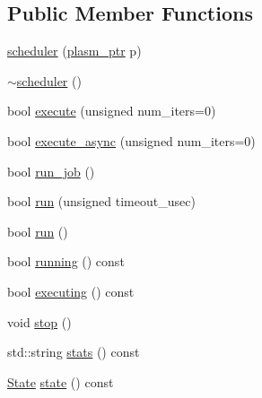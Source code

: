 \subsection*{\-Public \-Member \-Functions}
\begin{DoxyCompactItemize}
\item 
\hyperlink{classecto_1_1scheduler_a3a2999bde52bfacfc194243ef2ae4f89}{scheduler} (\hyperlink{namespaceecto_a6b83be6cd685db71f03b14871653475f}{plasm\-\_\-ptr} p)
\item 
\hyperlink{classecto_1_1scheduler_aac758e34705ebab32cf66bdf42f0d89d}{$\sim$scheduler} ()
\item 
bool \hyperlink{classecto_1_1scheduler_ad917e3fa322f0a065e306afec7284d4e}{execute} (unsigned num\-\_\-iters=0)
\item 
bool \hyperlink{classecto_1_1scheduler_a2e9982c19e57c9e578d2f8f54c24dc1a}{execute\-\_\-async} (unsigned num\-\_\-iters=0)
\item 
bool \hyperlink{classecto_1_1scheduler_a7fcfe7583c13ff5d2294242aedfa0b1a}{run\-\_\-job} ()
\item 
bool \hyperlink{classecto_1_1scheduler_a326022cba6c3154f28f9694b7c9968fd}{run} (unsigned timeout\-\_\-usec)
\item 
bool \hyperlink{classecto_1_1scheduler_a8d5ce4f97e511341f315bb7621ba38f4}{run} ()
\item 
bool \hyperlink{classecto_1_1scheduler_a99ac4b8df3d015f6a39d0cf7607cc657}{running} () const 
\item 
bool \hyperlink{classecto_1_1scheduler_a13257817e1cc6c1ce04ef0bfdabc5375}{executing} () const 
\item 
void \hyperlink{classecto_1_1scheduler_ab974783264da5c33a19110926b5565f4}{stop} ()
\item 
std\-::string \hyperlink{classecto_1_1scheduler_a99d2f51779f856b3905bb8b493f091c4}{stats} () const 
\item 
\hyperlink{classecto_1_1scheduler_a6b063d1c4bb9dad58d7ace61946b1200}{\-State} \hyperlink{classecto_1_1scheduler_a5497ae108416ccdf7d80fa7c8e462992}{state} () const 
\end{DoxyCompactItemize}
